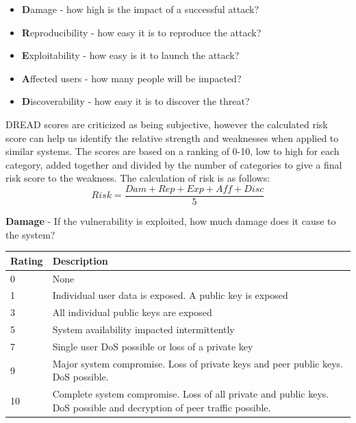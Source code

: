 \documentclass [11pt, proquest] {uwthesis}[2020/02/24]
\begin{document}
\begin{itemize}
  \item \textbf{D}amage - how high is the impact of a successful attack?
  \item \textbf{R}eproducibility - how easy it is to reproduce the attack? 
  \item \textbf{E}xploitability - how easy is it to launch the attack?
  \item \textbf{A}ffected users - how many people will be impacted?
  \item \textbf{D}iscoverability - how easy it is to discover the threat?
\end{itemize}
\bigskip

\label{dread}
DREAD scores are criticized as being subjective, however the calculated risk score can help us identify the relative strength and weaknesses when applied to similar systems. The scores are based on a ranking of 0-10, low to high for each category, added together and divided by the number of categories to give a final risk score to the weakness. 
The calculation of risk is as follows:
\begin{equation}
Risk = \frac{Dam + Rep + Exp + Aff + Disc }{5}
\end{equation}

\begin{table}[H] 
\label{dread:dmg}
\raggedright
\textbf{Damage} - If the vulnerability is exploited, how much damage does it cause to the system?
\begin{tabular}{|m{1.5cm}|p{15cm} |}
\hline
Rating & Description \\
\hline
0 &  None            \\
\hline
1 &  Individual user data is exposed. A public key is exposed \\
\hline
3 &  All individual public keys are exposed         \\
\hline
5 &  System availability impacted intermittently          \\
\hline
7 &  Single user DoS possible or loss of a private key  \\
\hline
9 &  Major system compromise. Loss of private keys and peer public keys. DoS possible. \\
\hline
10 & Complete system compromise. Loss of all private and public keys. DoS possible and decryption of peer traffic possible.\\
\hline
\end{tabular}
\end{table}
\end{document}
